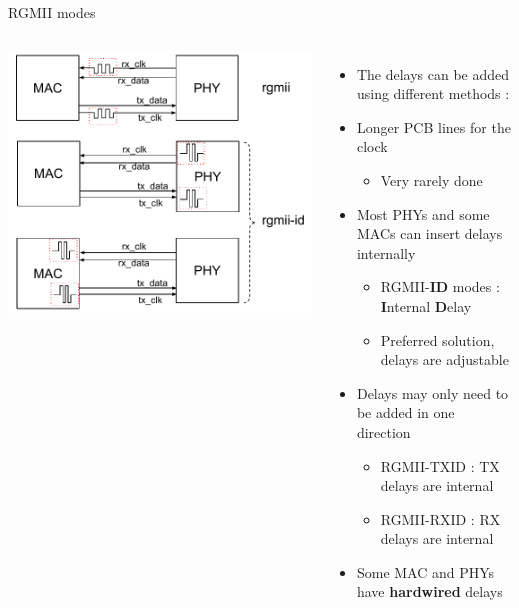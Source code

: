 \begin{frame}{RGMII modes}
		\begin{columns}
			\includegraphics[width=1.2\textwidth]{slides/networking-driver-phy/rgmii_modes.pdf}
			\begin{itemize}
			\item The delays can be added using different methods :
			\item Longer PCB lines for the clock
				\begin{itemize}
					\item Very rarely done
				\end{itemize}
			\item Most PHYs and some MACs can insert delays internally
				\begin{itemize}
					\item RGMII-\textbf{ID} modes : \textbf{I}nternal \textbf{D}elay
					\item Preferred solution, delays are adjustable
				\end{itemize}
			\item Delays may only need to be added in one direction
				\begin{itemize}
					\item RGMII-TXID : TX delays are internal
					\item RGMII-RXID : RX delays are internal
				\end{itemize}
			\item Some MAC and PHYs have \textbf{hardwired} delays
			\end{itemize}
		\end{columns}
\end{frame}

